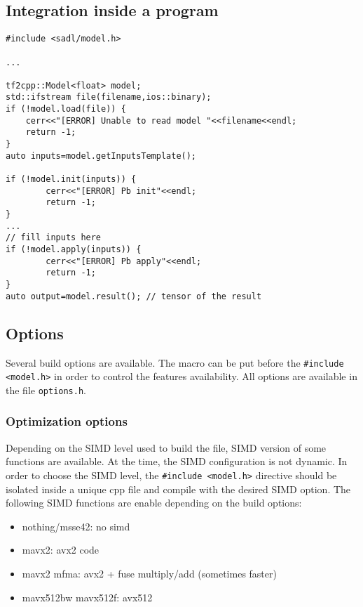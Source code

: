 \documentclass[10pt,a4paper]{article}
\begin{document}
\subsection{Integration inside a program}
\begin{lstlisting}[caption={Model inference in C++},style=codec]
#include <sadl/model.h>

...

tf2cpp::Model<float> model;
std::ifstream file(filename,ios::binary);
if (!model.load(file)) {
    cerr<<"[ERROR] Unable to read model "<<filename<<endl;
    return -1;
}
auto inputs=model.getInputsTemplate();

if (!model.init(inputs)) {
        cerr<<"[ERROR] Pb init"<<endl;
        return -1;
}
...
// fill inputs here
if (!model.apply(inputs)) {
        cerr<<"[ERROR] Pb apply"<<endl;
        return -1;
}
auto output=model.result(); // tensor of the result
\end{lstlisting}

\subsection{Options}
Several build options are available. The macro can be put before the \texttt{\#include <model.h>} in order to control the features availability. All options are available in the file  \texttt{options.h}.

\subsubsection{Optimization options}
Depending on the SIMD level used to build the file, SIMD version of some functions are available.
At the time, the SIMD configuration is not dynamic. In order to choose the SIMD level, the \texttt{\#include <model.h>} directive should be isolated inside a unique cpp file and compile with the desired SIMD option.
The following SIMD functions are enable depending on the build options:
\begin{itemize}
\item nothing/\-msse42: no simd
\item \-mavx2:  avx2 code
\item \-mavx2 \-mfma: avx2 + fuse multiply/add (sometimes faster)
\item \-mavx512bw \-mavx512f: avx512
\end{itemize}
\end{document}
